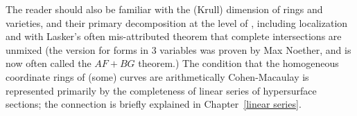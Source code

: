 The reader should also be familiar with the (Krull) dimension of rings and varieties, and their primary decomposition at the level of \cite{Atiyah-MacDonald}, including localization and with Lasker's often mis-attributed theorem that complete intersections are unmixed (the version for forms in 3 variables was proven by
Max Noether, and is now often called the $AF+BG$ theorem.) The condition that the homogeneous coordinate
rings of (some) curves are arithmetically Cohen-Macaulay is represented primarily by the completeness of linear series of hypersurface sections; the connection is briefly explained in Chapter~\ref{linear series}.




%
%
%




